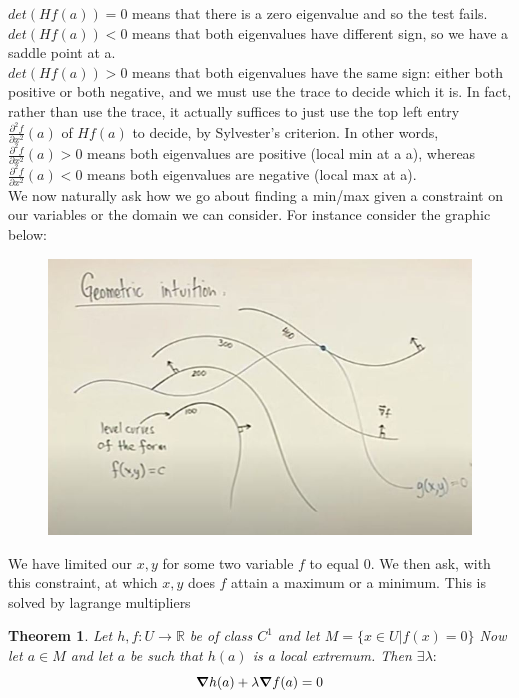 \documentclass[titlepage]{article}
\newtheorem{theorem}{Theorem}[section]
\begin{document}
$det(Hf(a))=0$ means that there is a zero eigenvalue and so the test fails.
\\
$det(Hf(a))<0$ means that both eigenvalues have different sign, so we have a saddle point at a.
\\
$det(Hf(a))>0$ means that both eigenvalues have the same sign: either both positive or both negative, and we must use the trace to decide which it is. In fact, rather than use the trace, it actually suffices to just use the top left entry $\frac{\partial^2 f}{\partial x^2} (a)$ of $Hf(a)$ to decide, by Sylvester's criterion. In other words, $\frac{\partial^2 f}{\partial x^2}(a) > 0$ means both eigenvalues are positive (local min at a a), whereas $\frac{\partial^2 f}{\partial x^2} (a) < 0$ means both eigenvalues are negative (local max at a).
\\

We now naturally ask how we go about finding a min/max given a constraint on our variables or the domain we can consider. For instance consider the graphic below:
\begin{figure}[H]
    \centering
    \includegraphics[scale = 0.5]{src/lagIntuition.JPG}
    \label{fig:my_label}
\end{figure}
We have limited our $x,y$ for some two variable $f$ to equal $0$. We then ask, with this constraint, at which $x,y$ does $f$ attain a maximum or a minimum. This is solved by lagrange multipliers

\begin{theorem}
Let $h,f: U \to \mathbb{R}$ be of class $C^{1}$ and let $M = \{x\in U|f(x)=0\}$ Now let $a \in M$ and let $a$ be such that $h(a)$ is a local extremum. Then $\exists \lambda:$
$$\grad h(a) + \lambda \grad f(a) = 0$$

\end{theorem}
\end{document}
